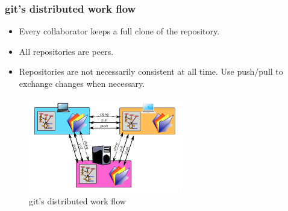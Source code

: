\documentclass[11pt,ignorenonframetext,]{beamer}
\begin{document}
\begin{frame}\frametitle{git's distributed work flow}

\begin{itemize}
\item
  Every collaborator keeps a full clone of the repository.
\item
  All repositories are peers.
\item
  Repositories are not necessarily consistent at all time. Use push/pull
  to exchange changes when necessary.
\end{itemize}
\begin{figure}[htbp]
\centering
\includegraphics[width=0.6\textwidth]{figures/gitdvcs.png}
\caption{git's distributed work flow}
\end{figure}

\end{frame}
\end{document}
